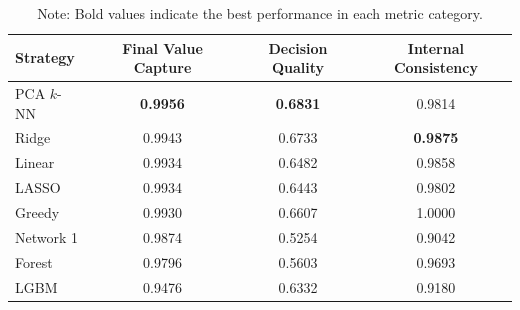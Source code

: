 \documentclass[11pt,reqno,a4paper]{amsart}
\theoremstyle{definition}
\numberwithin{equation}{section}
\DeclareMathOperator{\1}{\mathbbm{1}}
\begin{document}
\begin{table}[htbp]
  \centering
  \caption{Performance Metrics of Different Strategies, ACLP Experiment}
  \label{tab:strategy_metrics}
  \begin{tabular}{lccc}
    \toprule
    \textbf{Strategy} & \textbf{Final Value Capture} & \textbf{Decision Quality} & \textbf{Internal Consistency} \\
    \midrule
    PCA $k$-NN        & \textbf{0.9956}              & \textbf{0.6831}           & 0.9814                        \\
    Ridge             & 0.9943                       & 0.6733                    & \textbf{0.9875}               \\
    Linear            & 0.9934                       & 0.6482                    & 0.9858                        \\
    LASSO             & 0.9934                       & 0.6443                    & 0.9802                        \\
    Greedy            & 0.9930                       & 0.6607                    & 1.0000                        \\
    Network 1         & 0.9874                       & 0.5254                    & 0.9042                        \\
    Forest            & 0.9796                       & 0.5603                    & 0.9693                        \\
    LGBM              & 0.9476                       & 0.6332                    & 0.9180                        \\
    \bottomrule
  \end{tabular}
  \caption*{\small Note: Bold values indicate the best performance in each metric category.}
\end{table}
\end{document}

